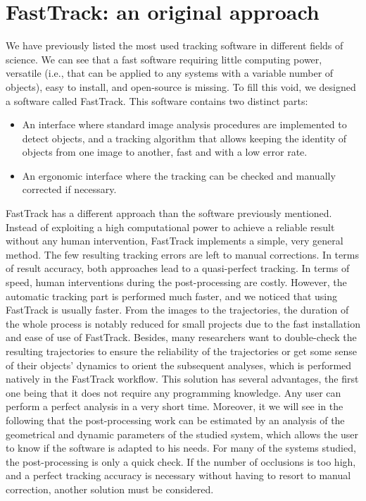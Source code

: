     \section{FastTrack: an original approach}
    We have previously listed the most used tracking software in different fields of science. We can see that a fast software requiring little computing power, versatile (i.e., that can be applied to any systems with a variable number of objects), easy to install, and open-source is missing.
    To fill this void, we designed a software called FastTrack. This software contains two distinct parts:
    \begin{itemize}
        \item An interface where standard image analysis procedures are implemented to detect objects, and a tracking algorithm that allows keeping the identity of objects from one image to another, fast and with a low error rate.
        \item An ergonomic interface where the tracking can be checked and manually corrected if necessary.
    \end{itemize}
    FastTrack has a different approach than the software previously mentioned. Instead of exploiting a high computational power to achieve a reliable result without any human intervention, FastTrack implements a simple, very general method. The few resulting tracking errors are left to manual corrections. In terms of result accuracy, both approaches lead to a quasi-perfect tracking. In terms of speed, human interventions during the post-processing are costly. However, the automatic tracking part is performed much faster, and we noticed that using FastTrack is usually faster. From the images to the trajectories, the duration of the whole process is notably reduced for small projects due to the fast installation and ease of use of FastTrack. Besides, many researchers want to double-check the resulting trajectories to ensure the reliability of the trajectories or get some sense of their objects' dynamics to orient the subsequent analyses, which is performed natively in the FastTrack workflow. This solution has several advantages, the first one being that it does not require any programming knowledge. Any user can perform a perfect analysis in a very short time. Moreover, it we will see in the following that the post-processing work can be estimated by an analysis of the geometrical and dynamic parameters of the studied system, which allows the user to know if the software is adapted to his needs. For many of the systems studied, the post-processing is only a quick check. If the number of occlusions is too high, and a perfect tracking accuracy is necessary without having to resort to manual correction, another solution must be considered.

